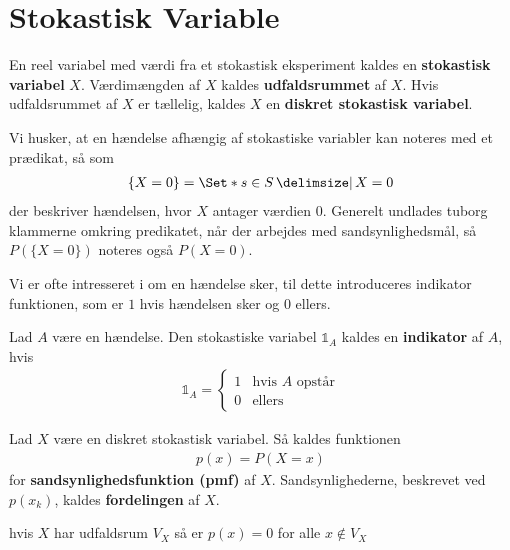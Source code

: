 \section{Stokastisk Variable} \label{sec:SV}
\begin{defn}%
En reel variabel med værdi fra et stokastisk eksperiment kaldes en \textbf{stokastisk variabel} $X$. Værdimængden af $X$ kaldes \textbf{udfaldsrummet} af $X$. Hvis udfaldsrummet af $X$ er tællelig, kaldes $X$ en \textbf{diskret stokastisk variabel}.
\end{defn}

Vi husker, at en hændelse afhængig af stokastiske variabler kan noteres med et prædikat, så som
\begin{align*}
    \{X=0\}=\Set*{s\in S\given X=0}
\end{align*}
der beskriver hændelsen, hvor $X$ antager værdien $0$.
Generelt undlades tuborg klammerne omkring predikatet, når der arbejdes med sandsynlighedsmål, så $P(\{X = 0\})$ noteres også $P(X = 0)$.

Vi er ofte intresseret i om en hændelse sker, til dette introduceres indikator funktionen, som er $1$ hvis hændelsen sker og $0$ ellers.
\begin{defn} [Indikator] %
    Lad $A$ være en hændelse. Den stokastiske variabel $\mathbb{1}_A$ kaldes en \textbf{indikator} af $A$, hvis
    \begin{align*}
        \mathbb{1}_A=\begin{cases}
          1 & \text{hvis } A \text{ opstår} \\
          0 & \text{ellers}
       \end{cases}
    \end{align*}
\end{defn}

\begin{defn} [Sandsynlighedsfunktion]%
    Lad $X$ være en diskret stokastisk variabel. Så kaldes funktionen
\begin{align*}
    p(x) = P(X=x) 
\end{align*}
for \textbf{sandsynlighedsfunktion (pmf)} af $X$. Sandsynlighederne, beskrevet ved $p(x_k)$, kaldes \textbf{fordelingen} af $X$.
\end{defn}
\begin{remark}
    hvis $X$ har udfaldsrum $V_X$ så er $p(x) = 0$ for alle $x \not \in V_X$
\end{remark}

